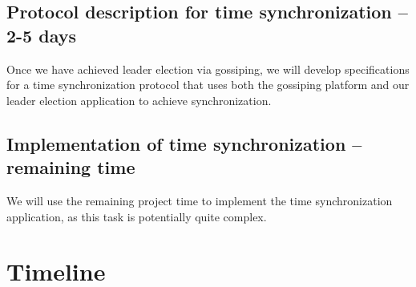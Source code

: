 \documentclass[11pt,
  a4paper,
  ngerman,
  BCOR=7mm
]{scrartcl}
\newcommand*{\ExtractCoordinate}[1]{\path (#1); \pgfgetlastxy{\XCoord}{\YCoord};}%
\begin{document}
\subsection*{Protocol description for time synchronization -- 2-5 days}
\label{sub:protocol_time_synch}
Once we have achieved leader election via gossiping, we will develop
specifications for a time synchronization protocol that uses both the
gossiping platform and our leader election application to achieve
synchronization.

\subsection*{Implementation of time synchronization -- remaining time}
\label{sub:implementation_time_synchronization}
We will use the remaining project time to implement the time
synchronization application, as this task is potentially quite complex.

\newpage

\section*{Timeline}
\label{sec:timeline}
\newcommand{\timeunit}{Weeks}
\pgfmathsetmacro{\timenodewidth}{2cm}
\setcounter{itemnumber}{0}
\newcommand{\lastnode}{n-0}

\newcommand{\timeentry}[2]{%
\stepcounter{itemnumber}
\node[below right,minimum width=\timenodewidth] (n-\theitemnumber) at (\lastnode.south west) {#2};
\node[right] at (n-\theitemnumber.east) {};

\edef\lastnode{n-\theitemnumber}

\expandafter\edef\csname nodetime\theitemnumber \endcsname{#1}
}

\newcommand{\drawtimeline}{%
    \draw[very thick,-latex] (0,0) -- ($(\lastnode.south west)-(\scaleitemseparation,0)+(0,-1)$);
    \ExtractCoordinate{n-\theitemnumber.south}
    \pgfmathsetmacro{\yposition}{\YCoord/28.452755}
    \foreach \x in {1,...,\theitemnumber}
    {   \pgfmathsetmacro{\timeposition}{\yposition/(\maxtime-\mintime)*\csname nodetime\x \endcsname}
        \draw (0,\timeposition) -- (0.5,\timeposition) -- ($(n-\x.west)-(0.5,0)$) -- (n-\x.west);
    }
    \foreach \x in {0,...,\timeintervals}
    {   \pgfmathsetmacro{\labelposition}{\yposition/(\maxtime-\mintime)*\x}
        \node[left] (label-\x) at (-0.2,\labelposition) {\x\ \timeunit};
        \draw (label-\x.east) -- ++ (0.2,0);
    }   
}

\end{document}
